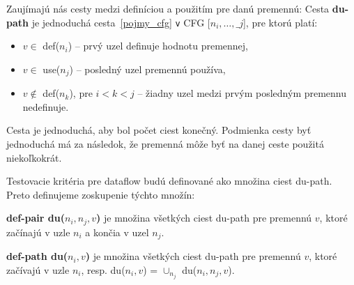 Zaujímajú nás cesty medzi definíciou a použitím pre danú premennú:
Cesta \textbf{du-path} je jednoduchá cesta~\ref{pojmy_cfg} \texttt{v} CFG [$n_i, \ldots, \_j$], pre ktorú platí:
\begin{itemize}
	\item $v \in$ def($n_i$) -- prvý uzel definuje hodnotu premennej,
	\item $v \in$ use($n_j$) -- posledný uzel premennú používa,
	\item $v \not\in$ def($n_k$), pre $i < k < j$ -- žiadny uzel medzi prvým posledným premennu nedefinuje.
\end{itemize}
Cesta je jednoduchá, aby bol počet ciest konečný.
Podmienka cesty byť jednoduchá má za následok, že premenná môže byť na danej ceste použitá niekoľkokrát.


Testovacie kritéria pre dataflow budú definované ako množina ciest du-path.
Preto definujeme zoskupenie týchto množín:
\begin{description}
	\item \textbf{def-pair du($n_i, n_j, v$)} je množina všetkých ciest du-path pre premennú $v$, ktoré začínajú v uzle $n_i$ a končia v uzel $n_j$.

	\item \textbf{def-path du($n_i, v$)} je množina všetkých ciest du-path pre premennú $v$, ktoré začívajú v uzle $n_i$, resp. du($n_i, v$) = $\cup_{n_j}$ du($n_i, n_j, v$).
\end{description}

